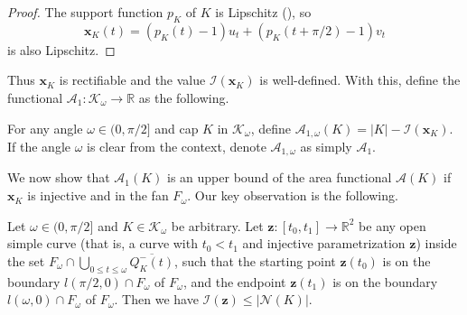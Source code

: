 \begin{proof}
The support function \(p_K\) of \(K\) is Lipschitz (), so
\[
\mathbf{x}_K(t) = (p_K(t) - 1) u_t + (p_K(t + \pi/2) - 1) v_t
\]
is also Lipschitz.
\end{proof}

Thus \(\mathbf{x}_K\) is rectifiable and the value \(\mathcal{I}(\mathbf{x}_K)\) is well-defined. With this, define the functional \(\mathcal{A}_1 : \mathcal{K}_\omega \to \mathbb{R}\) as the following.

\begin{definition}

For any angle \(\omega \in (0, \pi/2]\) and cap \(K\) in \(\mathcal{K}_\omega\), define \(\mathcal{A}_{1, \omega}(K) = |K| - \mathcal{I}(\mathbf{x}_K)\). If the angle \(\omega\) is clear from the context, denote \(\mathcal{A}_{1, \omega}\) as simply \(\mathcal{A}_1\).

\label{def:a1}
\end{definition}

We now show that \(\mathcal{A}_1(K)\) is an upper bound of the area functional \(\mathcal{A}(K)\) if \(\mathbf{x}_K\) is injective and in the fan \(F_\omega\). Our key observation is the following.

\begin{lemma}

Let \(\omega \in (0, \pi/2]\) and \(K \in \mathcal{K}_{\omega}\) be arbitrary. Let \(\mathbf{z} : [t_0, t_1] \to \mathbb{R}^2\) be any open simple curve (that is, a curve with \(t_0 < t_1\) and injective parametrization \(\mathbf{z}\)) inside the set \(F_{\omega} \cap \bigcup_{0 \leq t \leq \omega} \overline{Q^-_K(t)}\), such that the starting point \(\mathbf{z}(t_0)\) is on the boundary \(l(\pi/2, 0) \cap F_\omega\) of \(F_\omega\), and the endpoint \(\mathbf{z}(t_1)\) is on the boundary \(l(\omega, 0) \cap F_\omega\) of \(F_\omega\). Then we have \(\mathcal{I}(\mathbf{z}) \leq |\mathcal{N}(K)|\).

\label{lem:curve-area-functional-lower-bound}
\end{lemma}

